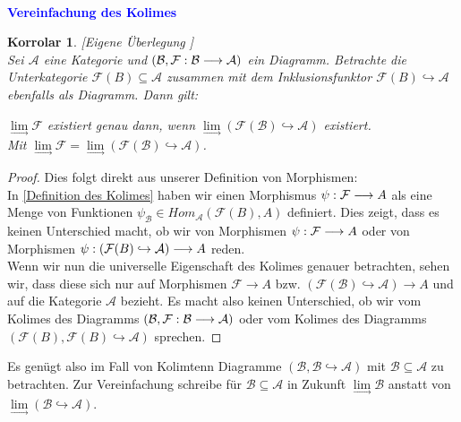 \documentclass[10pt,a4paper]{report}
\newcounter{Aussage}[chapter]
\newtheorem{korrolar}[Aussage]{Korrolar}
\newcommand{\functionfront}[3]{\nolinebreak{#1:#2 \longrightarrow #3}}
\newcommand{\colimes}[0]{\lim\limits_{ \longrightarrow }}
\begin{document}
\ \\
\textcolor{blue}{\textbf{Vereinfachung des Kolimes}}
\begin{korrolar}\label{Vereinfachung des Kolimes} \textit{[Eigene Überlegung ]}\\
Sei $\mathcal{A}$ eine Kategorie und $(\mathcal{B}, \functionfront{\mathcal{F}}{\mathcal{B}}{\mathcal{A}})$ ein Diagramm. Betrachte die Unterkategorie $\mathcal{F}(B) \subseteq \mathcal{A}$ zusammen mit dem Inklusionsfunktor $\mathcal{F}(B)\hookrightarrow \mathcal{A}$ ebenfalls als Diagramm. Dann gilt:
\begin{center}
$\colimes \mathcal{F}$ existiert genau dann, wenn $\colimes (\mathcal{F}(\mathcal{B}) \hookrightarrow \mathcal{A})$ existiert.\\
Mit $\colimes \mathcal{F} = \colimes (\mathcal{F}(\mathcal{B}) \hookrightarrow \mathcal{A})$.
\end{center}
\end{korrolar}
\begin{proof}
Dies folgt direkt aus unserer Definition von Morphismen:\\
In \cref{Definition des Kolimes} haben wir einen Morphismus $\functionfront{\psi}{\mathcal{F}}{A}$ als eine Menge von Funktionen $\mathcal{\psi_B} \in Hom_{\mathcal{A}}(\mathcal{F}(B),A)$ definiert. Dies zeigt, dass es keinen Unterschied macht, ob wir von Morphismen $\functionfront{\psi}{\mathcal{F}}{A}$ oder von Morphismen $\functionfront{\psi}{(\mathcal{F}(B)\hookrightarrow \mathcal{A})}{A}$ reden.\\
Wenn wir nun die universelle Eigenschaft des Kolimes genauer betrachten, sehen wir, dass diese sich nur auf Morphismen $\mathcal{F} \longrightarrow A$ bzw. $(\mathcal{F}(\mathcal{B}) \hookrightarrow \mathcal{A}) \longrightarrow A$ und auf die Kategorie $\mathcal{A}$ bezieht. Es macht also keinen Unterschied, ob wir vom Kolimes des Diagramms $(\mathcal{B}, \functionfront{\mathcal{F}}{\mathcal{B}}{\mathcal{A}})$ oder vom Kolimes des Diagramms $(\mathcal{F}(B),\mathcal{F}(B)\hookrightarrow \mathcal{A})$ sprechen.
\end{proof}
Es genügt also im Fall von Kolimtenn Diagramme $(\mathcal{B},\mathcal{B}\hookrightarrow\mathcal{A})$ mit $\mathcal{B} \subseteq \mathcal{A}$ zu betrachten. Zur Vereinfachung schreibe für $\mathcal{B} \subseteq \mathcal{A}$ in Zukunft $\colimes \mathcal{B}$ anstatt von $\colimes (\mathcal{B} \hookrightarrow \mathcal{A})$.
\end{document}
